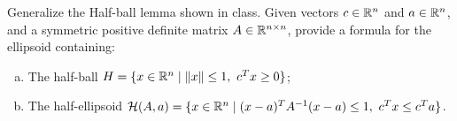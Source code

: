 \documentclass[11pt]{article}
\begin{document}
\problem
Generalize the Half-ball lemma shown in class. Given vectors $c \in \mathbb{R}^n$ and $a\in \mathbb{R}^n$, and a symmetric positive definite matrix $A \in \mathbb{R}^{n\times n}$, provide a formula for the ellipsoid containing:
\begin{enumerate}[a)]
	\item
	  The half-ball $H=\{x \in \mathbb{R}^n \mid \|x\|\leq 1, \ c^Tx \geq 0 \}$;
	\item
	  The half-ellipsoid $\mathcal{H}(A,a)=\{x \in \mathbb{R}^n \mid (x-a)^TA^{-1}(x-a)\leq 1, \ c^Tx \leq c^Ta \}$. 
\end{enumerate}
\end{document}
